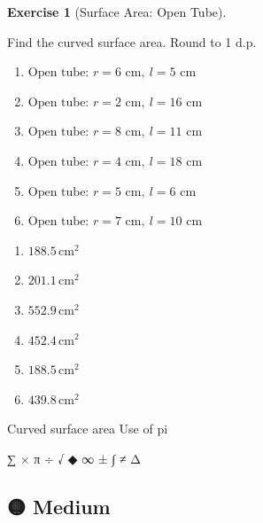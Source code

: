 \documentclass[
  letterpaper,
  DIV=11,
  numbers=noendperiod]{scrreprt}
\theoremstyle{definition}
\newtheorem{exercise}{Exercise}[chapter]
\theoremstyle{remark}
\begin{document}
\begin{exercise}[Surface Area: Open
Tube]\protect\hypertarget{exr-sa-8}{}\label{exr-sa-8}

Find the curved surface area. Round to 1 d.p.

\begin{enumerate}
\def\labelenumi{\alph{enumi})}
\item
  \(\text{Open tube: }r=6\text{ cm},\ l=5\text{ cm}\)
\item
  \(\text{Open tube: }r=2\text{ cm},\ l=16\text{ cm}\)
\item
  \(\text{Open tube: }r=8\text{ cm},\ l=11\text{ cm}\)
\item
  \(\text{Open tube: }r=4\text{ cm},\ l=18\text{ cm}\)
\item
  \(\text{Open tube: }r=5\text{ cm},\ l=6\text{ cm}\)
\item
  \(\text{Open tube: }r=7\text{ cm},\ l=10\text{ cm}\)
\end{enumerate}

\begin{tcolorbox}[enhanced jigsaw, opacitybacktitle=0.6, coltitle=black, arc=.35mm, colframe=quarto-callout-tip-color-frame, colback=white, bottomrule=.15mm, left=2mm, colbacktitle=quarto-callout-tip-color!10!white, titlerule=0mm, opacityback=0, title=\textcolor{quarto-callout-tip-color}{\faLightbulb}\hspace{0.5em}{🔍 View Solution}, leftrule=.75mm, breakable, rightrule=.15mm, bottomtitle=1mm, toptitle=1mm, toprule=.15mm]

\begin{enumerate}
\def\labelenumi{\alph{enumi})}
\item
  \(188.5\,\text{cm}^{2}\)
\item
  \(201.1\,\text{cm}^{2}\)
\item
  \(552.9\,\text{cm}^{2}\)
\item
  \(452.4\,\text{cm}^{2}\)
\item
  \(188.5\,\text{cm}^{2}\)
\item
  \(439.8\,\text{cm}^{2}\)
\end{enumerate}

\end{tcolorbox}

{Curved surface area} {Use of pi}

\end{exercise}

∑ × π ÷ √ ◆ ∞ ± ∫ ≠ Δ

\subsection{🟡 Medium}
\end{document}
